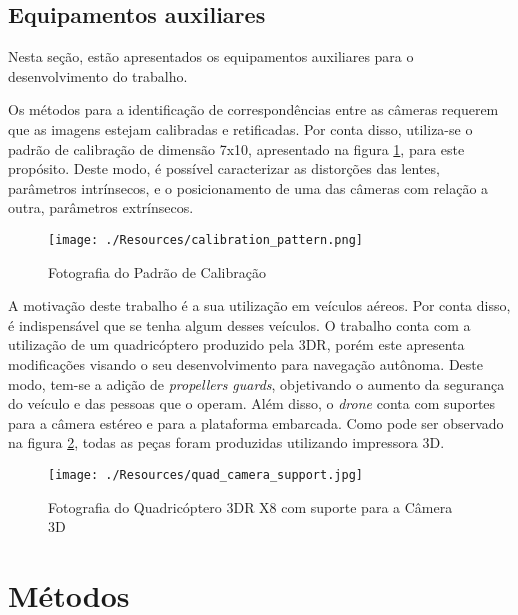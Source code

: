 \subsection{Equipamentos auxiliares}

Nesta seção, estão apresentados os equipamentos auxiliares para o desenvolvimento do trabalho. 

Os métodos para a identificação de correspondências entre as câmeras requerem que as imagens estejam calibradas e retificadas. Por conta disso, utiliza-se o padrão de calibração de dimensão 7x10, apresentado na figura \ref{calibration_pattern}, para este propósito. Deste modo, é possível caracterizar as distorções das lentes, parâmetros intrínsecos, e o posicionamento de uma das câmeras com relação a outra, parâmetros extrínsecos.  

\begin{figure}[]
	\centering
	\texttt{[image: ./Resources/calibration\_pattern.png]}
	\caption{Fotografia do Padrão de Calibração}
	\label{calibration_pattern}
\end{figure}

A motivação deste trabalho é a sua utilização em veículos aéreos. Por conta disso, é indispensável que se tenha algum desses veículos. O trabalho conta com a utilização de um quadricóptero produzido pela 3DR\texttrademark \cite{3DRX8}, porém este apresenta modificações visando o seu desenvolvimento para navegação autônoma. Deste modo, tem-se a adição de \textit{propellers guards}, objetivando o aumento da segurança do veículo e das pessoas que o operam. Além disso, o \textit{drone} conta com suportes para a câmera estéreo e para a plataforma embarcada. Como pode ser observado na figura \ref{quad_camera_support}, todas as peças foram produzidas utilizando impressora 3D.

\begin{figure}[H]
	\centering
	\texttt{[image: ./Resources/quad\_camera\_support.jpg]}
	\caption{Fotografia do Quadricóptero 3DR X8 com suporte para a Câmera 3D}
	\label{quad_camera_support}
\end{figure}


\section{Métodos}

